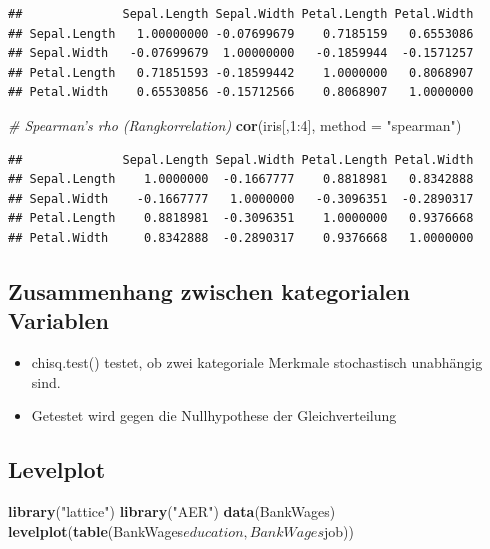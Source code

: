 \documentclass[]{article}
\newenvironment{Shaded}{\begin{snugshade}}{\end{snugshade}}
\newcommand{\KeywordTok}[1]{\textcolor[rgb]{0.13,0.29,0.53}{\textbf{{#1}}}}
\newcommand{\DataTypeTok}[1]{\textcolor[rgb]{0.13,0.29,0.53}{{#1}}}
\newcommand{\DecValTok}[1]{\textcolor[rgb]{0.00,0.00,0.81}{{#1}}}
\newcommand{\StringTok}[1]{\textcolor[rgb]{0.31,0.60,0.02}{{#1}}}
\newcommand{\CommentTok}[1]{\textcolor[rgb]{0.56,0.35,0.01}{\textit{{#1}}}}
\newcommand{\NormalTok}[1]{{#1}}
\providecommand{\tightlist}{%
  \setlength{\itemsep}{0pt}\setlength{\parskip}{0pt}}
\begin{document}
\begin{verbatim}
##              Sepal.Length Sepal.Width Petal.Length Petal.Width
## Sepal.Length   1.00000000 -0.07699679    0.7185159   0.6553086
## Sepal.Width   -0.07699679  1.00000000   -0.1859944  -0.1571257
## Petal.Length   0.71851593 -0.18599442    1.0000000   0.8068907
## Petal.Width    0.65530856 -0.15712566    0.8068907   1.0000000
\end{verbatim}

\begin{Shaded}
\begin{Highlighting}[]
\CommentTok{# Spearman's rho (Rangkorrelation)}
\KeywordTok{cor}\NormalTok{(iris[,}\DecValTok{1}\NormalTok{:}\DecValTok{4}\NormalTok{], }\DataTypeTok{method =} \StringTok{"spearman"}\NormalTok{) }
\end{Highlighting}
\end{Shaded}

\begin{verbatim}
##              Sepal.Length Sepal.Width Petal.Length Petal.Width
## Sepal.Length    1.0000000  -0.1667777    0.8818981   0.8342888
## Sepal.Width    -0.1667777   1.0000000   -0.3096351  -0.2890317
## Petal.Length    0.8818981  -0.3096351    1.0000000   0.9376668
## Petal.Width     0.8342888  -0.2890317    0.9376668   1.0000000
\end{verbatim}

\subsection{Zusammenhang zwischen kategorialen
Variablen}\label{zusammenhang-zwischen-kategorialen-variablen}

\begin{itemize}
\tightlist
\item
  chisq.test() testet, ob zwei kategoriale Merkmale stochastisch
  unabhängig sind.
\item
  Getestet wird gegen die Nullhypothese der Gleichverteilung
\end{itemize}

\subsection{Levelplot}\label{levelplot}

\begin{Shaded}
\begin{Highlighting}[]
\KeywordTok{library}\NormalTok{(}\StringTok{"lattice"}\NormalTok{)}
\KeywordTok{library}\NormalTok{(}\StringTok{"AER"}\NormalTok{)}
\KeywordTok{data}\NormalTok{(BankWages)}
\KeywordTok{levelplot}\NormalTok{(}\KeywordTok{table}\NormalTok{(BankWages$education,BankWages$job))}
\end{Highlighting}
\end{Shaded}
\end{document}
